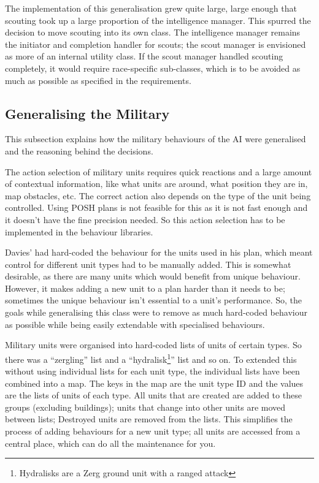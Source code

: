 \documentclass[11pt,openright,a4paper]{report}
\begin{document}
The implementation of this generalisation grew quite large, large enough that scouting took up a large proportion of the intelligence manager. This spurred the decision to move scouting into its own class. The intelligence manager remains the initiator and completion handler for scouts; the scout manager is envisioned as more of an internal utility class. If the scout manager handled scouting completely, it would require race-specific sub-classes, which is to be avoided as much as possible as specified in the requirements.

\subsection{Generalising the Military}
\label{MilitaryGen}
This subsection explains how the military behaviours of the AI were generalised and the reasoning behind the decisions.

The action selection of military units requires quick reactions and a large amount of contextual information, like what units are around, what position they are in, map obstacles, etc. The correct action also depends on the type of the unit being controlled. Using POSH plans is not feasible for this as it is not fast enough and it doesn't have the fine precision needed. So this action selection has to be implemented in the behaviour libraries.

Davies' had hard-coded the behaviour for the units used in his plan, which meant control for different unit types had to be manually added. This is somewhat desirable, as there are many units which would benefit from unique behaviour. However, it makes adding a new unit to a plan harder than it needs to be; sometimes the unique behaviour isn't essential to a unit's performance. So, the goals while generalising this class were to remove as much hard-coded behaviour as possible while being easily extendable with specialised behaviours.

Military units were organised into hard-coded lists of units of certain types. So there was a ``zergling'' list and a ``hydralisk\footnote{Hydralisks are a Zerg ground unit with a ranged attack}'' list and so on. To extended this without using individual lists for each unit type, the individual lists have been combined into a map. The keys in the map are the unit type ID and the values are the lists of units of each type. All units that are created are added to these groups (excluding buildings); units that change into other units are moved between lists; Destroyed units are removed from the lists. This simplifies the process of adding behaviours for a new unit type; all units are accessed from a central place, which can do all the maintenance for you.
\end{document}
